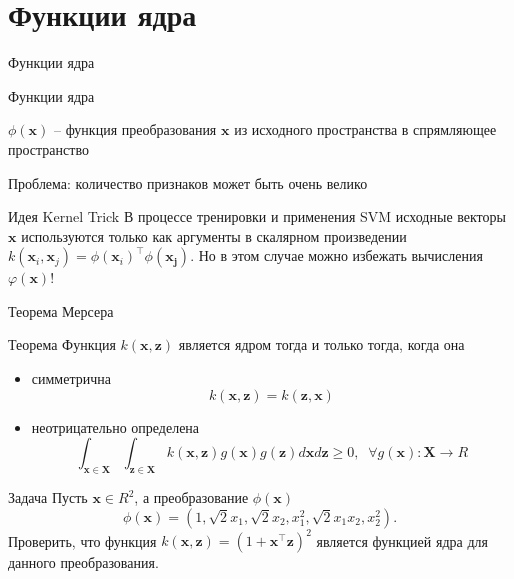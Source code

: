 \documentclass[10pt]{beamer}
\begin{document}
\section{Функции ядра}


\begin{frame}{}

\begin{center}
\Large Функции ядра
\end{center}

\end{frame}

\begin{frame}{Функции ядра}

$\phi(\mathbf{x})$ --  функция преобразования $\mathbf x$ из исходного пространства в спрямляющее пространство

\vspace{1em}
Проблема: количество признаков может быть очень велико

\vspace{1em}
\begin{block}{Идея Kernel Trick}
В процессе тренировки и применения SVM исходные векторы $\mathbf x$ используются только как аргументы в скалярном произведении $k(\mathbf x_i, \mathbf{x}_j) = \phi(\mathbf x_i)^\top \phi(\mathbf{x_j})$. Но в этом случае можно избежать вычисления $\varphi(\mathbf x)$!
\end{block}

\end{frame}

\begin{frame}{Теорема Мерсера}

\begin{alertblock}{Теорема}
Функция $k(\mathbf x, \mathbf z)$ является ядром тогда и только тогда, когда она 
\begin{itemize}
\item симметрична 
\[
k(\mathbf x, \mathbf z) = k(\mathbf z, \mathbf x)
\]
\item неотрицательно определена
\[
\int_{\mathbf x \in \mathbf X} \int_{\mathbf z \in \mathbf X} k(\mathbf x, \mathbf z) g(\mathbf x) g(\mathbf z) d\mathbf x d\mathbf z \geqslant 0, \;\; \forall g(\mathbf{x}): \mathbf{X} \rightarrow R
\]
\end{itemize}
\end{alertblock}

\begin{block}{Задача}
Пусть $\mathbf x \in R^2$, а преобразование $\phi(\mathbf{x})$
\[
\phi(\mathbf{x}) = (1, \sqrt{2} x_1, \sqrt{2} x_2, x_1^2, \sqrt{2} x_1 x_2, x_2^2).
\]
Проверить, что функция $k(\mathbf{x}, \mathbf{z}) = (1 + \mathbf x^\top \mathbf z)^2$ является функцией ядра для данного преобразования.
\end{block}

\end{frame}
\end{document}
